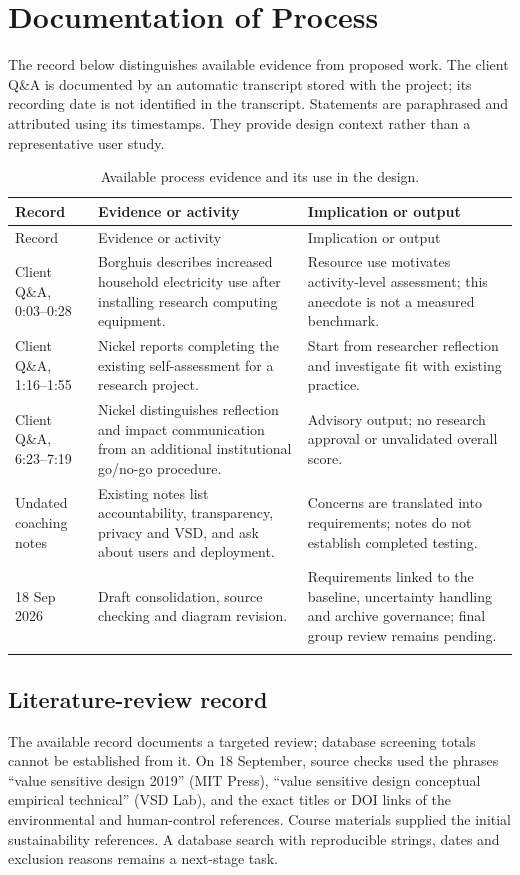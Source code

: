 \documentclass[11pt,a4paper]{article}
\begin{document}
\clearpage
\nocite{*}



\appendix
\clearpage
\section{Documentation of Process}
\label{app:process}
The record below distinguishes available evidence from proposed work. The client Q\&A is documented by an automatic transcript stored with the project; its recording date is not identified in the transcript. Statements are paraphrased and attributed using its timestamps. They provide design context rather than a representative user study.

\begin{longtable}{@{}p{}p{}p{}@{}}
\toprule
Record & Evidence or activity & Implication or output \\
\midrule\endfirsthead
\toprule Record & Evidence or activity & Implication or output \\
\midrule\endhead
Client Q\&A, 0:03--0:28 & Borghuis describes increased household electricity use after installing research computing equipment. & Resource use motivates activity-level assessment; this anecdote is not a measured benchmark. \\
\midrule
Client Q\&A, 1:16--1:55 & Nickel reports completing the existing self-assessment for a research project. & Start from researcher reflection and investigate fit with existing practice. \\
\midrule
Client Q\&A, 6:23--7:19 & Nickel distinguishes reflection and impact communication from an additional institutional go/no-go procedure. & Advisory output; no research approval or unvalidated overall score. \\
\midrule
Undated coaching notes & Existing notes list accountability, transparency, privacy and VSD, and ask about users and deployment. & Concerns are translated into requirements; notes do not establish completed testing. \\
\midrule
18 Sep 2026 & Draft consolidation, source checking and diagram revision. & Requirements linked to the baseline, uncertainty handling and archive governance; final group review remains pending. \\
\bottomrule
\caption{Available process evidence and its use in the design.}\\
\end{longtable}

\subsection*{Literature-review record}
The available record documents a targeted review; database screening totals cannot be established from it. On 18 September, source checks used the phrases ``value sensitive design 2019'' (MIT Press), ``value sensitive design conceptual empirical technical'' (VSD Lab), and the exact titles or DOI links of the environmental and human-control references. Course materials supplied the initial sustainability references. A database search with reproducible strings, dates and exclusion reasons remains a next-stage task.
\end{document}
